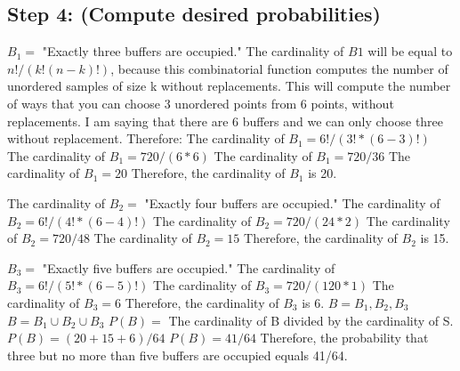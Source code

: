 \documentclass[a4paper,10pt]{article}
\begin{document}
\subsection{Step 4: (Compute desired probabilities)}
$ B_{1} = $ "Exactly three buffers are occupied." \newline
The cardinality of $ B{1} $ will be equal to $ n!/(k!(n-k)!) $, because this combinatorial function computes the 
number 
of unordered samples of size k without replacements. This will compute the number of ways that you can choose 3 
unordered points from 6 points, without replacements. I am saying that there are 6 buffers and we can only 
choose three without replacement. Therefore: \newline
The cardinality of $ B_{1} = 6!/(3!*(6-3)!) $ \newline
The cardinality of $ B_{1} = 720/(6*6) $ \newline
The cardinality of $ B_{1} = 720/36 $ \newline
The cardinality of $ B_{1} = 20 $ \newline
Therefore, the cardinality of $ B_{1} $ is 20. \newline

The cardinality of $ B_{2} = $ "Exactly four buffers are occupied."
The cardinality of $ B_{2} = 6!/(4!*(6-4)!) $ \newline
The cardinality of $ B_{2} = 720/(24*2) $ \newline
The cardinality of $ B_{2} = 720/48 $ \newline
The cardinality of $ B_{2} = 15 $ \newline
Therefore, the cardinality of $ B_{2} $ is 15. \newline

$ B_{3} = $ "Exactly five buffers are occupied."
The cardinality of $ B_{3} = 6!/(5!*(6-5)!) $ \newline
The cardinality of $ B_{3} = 720/(120*1) $
The cardinality of $ B_{3} = 6 $ \newline
Therefore, the cardinality of $ B_{3} $ is 6. \newline
$ B = {B_{1}, B_{2}, B_{3}} $ \newline
$ B = B_{1} \cup B_{2} \cup B_{3} $ \newline
$ P(B) = $ The cardinality of B divided by the cardinality of S. \newline
$ P(B) = (20+15+6)/64 $ \newline
$ P(B) = 41 /64 $ \newline
Therefore, the probability that three but no more than five buffers are occupied equals 41/64.
\end{document}
